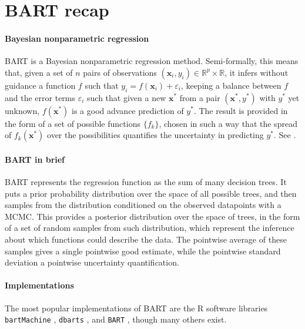 \documentclass{article}
\begin{document}
    \section{BART recap}
    \label{sec:bart}

    \paragraph{Bayesian nonparametric regression}

    BART is a Bayesian nonparametric regression method. Semi-formally, this means that, given a set of $n$ pairs of observations $(\mathbf x_i,y_i) \in \mathbb R^p \times \mathbb R$, it infers without guidance a function $f$ such that $y_i = f(\mathbf x_i) + \varepsilon_i$, keeping a balance between $f$ and the error terms $\varepsilon_i$ such that given a new $\mathbf x^*$ from a pair $(\mathbf x^*, y^*)$ with $y^*$ yet unknown, $f(\mathbf x^*)$ is a good advance prediction of $y^*$. The result is provided in the form of a set of possible functions $\{f_k\}$, chosen in such a way that the spread of $f_k(\mathbf x^*)$ over the possibilities quantifies the uncertainty in predicting $y^*$. See \textcite[ch.~4]{muller2015}.

    \paragraph{BART in brief}

    BART represents the regression function as the sum of many decision trees. It puts a prior probability distribution over the space of all possible trees, and then samples from the distribution conditioned on the observed datapoints with a MCMC. This provides a posterior distribution over the space of trees, in the form of a set of random samples from such distribution, which represent the inference about which functions could describe the data. The pointwise average of these samples gives a single pointwise good estimate, while the pointwise standard deviation a pointwise uncertainty quantification.

    \paragraph{Implementations}

    The most popular implementations of BART are the R software libraries \texttt{bartMachine} \autocite{kapelner2016,kapelner2023}, \texttt{dbarts} \autocite{dorie2024}, and \texttt{BART} \autocite{sparapani2021,mcculloch2024}, though many others exist.
\end{document}
